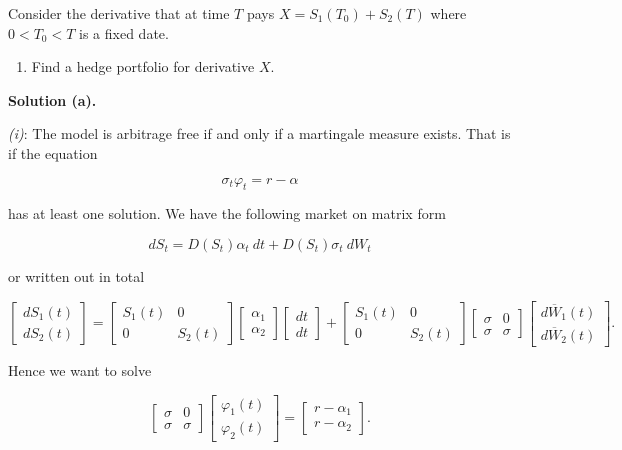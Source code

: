 \documentclass[a4paper,12pt,openany]{book}
\providecommand{\tightlist}{%
 \setlength{\itemsep}{0pt}\setlength{\parskip}{0pt}}
\begin{document}
Consider the derivative that at time \(T\) pays \(X=S_1(T_0)+S_2(T)\) where \(0<T_0<T\) is a fixed date.

\begin{enumerate}
\def\labelenumi{\alph{enumi}.}
\setcounter{enumi}{2}
\tightlist
\item
  Find a hedge portfolio for derivative \(X\).
\end{enumerate}

\noindent\makebox[\linewidth]{\rule{\textwidth}{0.4pt}}

\textbf{Solution (a).}

\emph{(i)}: The model is arbitrage free if and only if a martingale measure exists. That is if the equation

\[
\sigma_t\varphi_t=r-\alpha
\]

has at least one solution. We have the following market on matrix form

\[
dS_t=D(S_t)\alpha_t\ dt+D(S_t)\sigma _t\ dW_t
\]

or written out in total

\[
\begin{bmatrix}
dS_1(t)\\
dS_2(t)
\end{bmatrix}
=
\begin{bmatrix}
S_1(t) & 0\\
0 & S_2(t)
\end{bmatrix}
\begin{bmatrix}
\alpha_1\\
\alpha_2
\end{bmatrix}
\begin{bmatrix}
dt\\
dt
\end{bmatrix}
+
\begin{bmatrix}
S_1(t) & 0\\
0 & S_2(t)
\end{bmatrix}
\begin{bmatrix}
\sigma & 0\\
\sigma & \sigma
\end{bmatrix}
\begin{bmatrix}
d\overline{W}_1(t)\\
d\overline{W}_2(t)
\end{bmatrix}.
\]

Hence we want to solve

\[
\begin{bmatrix}
\sigma & 0\\
\sigma & \sigma
\end{bmatrix}\begin{bmatrix}
\varphi_1(t)\\
\varphi_2(t)
\end{bmatrix}=
\begin{bmatrix}
r-\alpha_1\\
r-\alpha_2
\end{bmatrix}.
\]
\end{document}
